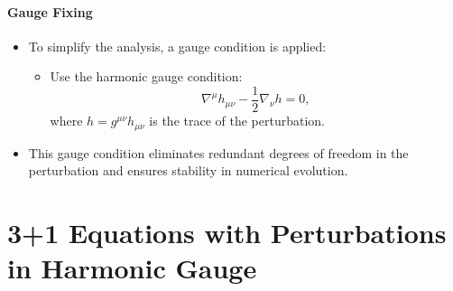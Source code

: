 \documentclass[12pt]{article}
\begin{document}
\paragraph{Gauge Fixing}
\begin{itemize}
    \item To simplify the analysis, a gauge condition is applied:
    \begin{itemize}
        \item Use the harmonic gauge condition:
        \[
        \nabla^\mu h_{\mu\nu} - \frac{1}{2} \nabla_\nu h = 0,
        \]
        where $h = g^{\mu\nu} h_{\mu\nu}$ is the trace of the perturbation.
    \end{itemize}
    \item This gauge condition eliminates redundant degrees of freedom in the perturbation and ensures stability in numerical evolution.
\end{itemize}

\section{3+1 Equations with Perturbations in Harmonic Gauge}
\end{document}
